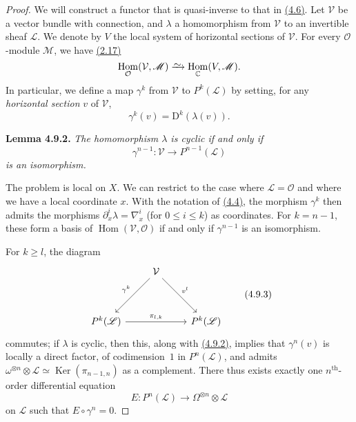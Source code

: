 \documentclass{report}
\newenvironment{itenv}[1]
  {\phantomsection\par\medskip\noindent\textbf{#1.}\itshape}
  {\par\medskip}
\newcommand{\scr}[1]{{\mathscr{#1}}}
\renewcommand{\cal}[1]{{\mathcal{#1}}}
\newcommand{\CC}{\mathbb{C}}
\newcommand{\DD}{\mathrm{D}}
\newcommand{\simto}{\xrightarrow{\raisebox{-0.7ex}[0ex][0ex]{$\sim$}}}
\renewcommand{\geq}{\geqslant}
\renewcommand{\leq}{\leqslant}
\DeclareMathOperator{\Ker}{Ker}
\DeclareMathOperator{\Hom}{Hom}
\newcommand{\oldpage}[1]{\marginpar{\footnotesize$\Big\vert$ \textit{p.~#1}}}
\begin{document}
\begin{proof}
  We will construct a functor that is quasi-inverse to that in \hyperref[I.4.6]{(4.6)}.
  Let $\cal{V}$ be a vector bundle with connection, and $\lambda$ a homomorphism from $\cal{V}$ to an invertible sheaf $\scr{L}$.
  We denote by $V$ the local system of horizontal sections of $\cal{V}$.
  For every $\cal{O}$-module $\scr{M}$, we have \hyperref[I.2.17]{(2.17)}
  \[
    \Hom_\cal{O}(\cal{V},\scr{M}) \simto \Hom_\CC(V,\scr{M}).
  \]
  In particular, we define a map $\gamma^k$ from $\cal{V}$ to $P^k(\scr{L})$ by setting, for any \emph{horizontal section} $v$ of $\cal{V}$,
  \[
  \label{I.4.9.1}
    \gamma^k(v) = \DD^k(\lambda(v)).
  \tag{4.9.1}
  \]

  \begin{itenv}{Lemma 4.9.2}
  \label{I.4.9.2}
    The homomorphism $\lambda$ is cyclic if and only if
    \[
      \gamma^{n-1}\colon \cal{V} \to P^{n-1}(\scr{L})
    \]
    is an isomorphism.
  \end{itenv}

  The problem is local on $X$.
  We can restrict to the case where $\scr{L}=\cal{O}$ and where we have a local coordinate $x$.
  With the notation of \hyperref[I.4.4]{(4.4)}, the morphism $\gamma^k$ then admits the morphisms $\partial_x^i\lambda = \nabla_x^i$ (for $0\leq i\leq k$) as coordinates.
  For $k=n-1$, these form a basis of $\Hom(\cal{V},\cal{O})$ if and only if $\gamma^{n-1}$ is an isomorphism.

  For $k\geq l$, the diagram
\oldpage{28}
  \[
  \label{I.4.9.3}
    \begin{tikzcd}[row sep=huge]
      & \cal{V} \dlar[swap,"\gamma^k"] \drar["v^l"] &
    \\P^k(\scr{L}) \ar[rr,"\pi_{l,k}"] && P^k(\scr{L})
    \end{tikzcd}
  \tag{4.9.3}
  \]
  commutes;
  if $\lambda$ is cyclic, then this, along with \hyperref[I.4.9.2]{(4.9.2)}, implies that $\gamma^n(v)$ is locally a direct factor, of codimension~$1$ in $P^n(\scr{L})$, and admits $\omega^{\otimes n}\otimes\scr{L} \simeq \Ker(\pi_{n-1,n})$ as a complement.
  There thus exists exactly one $n^\mathrm{th}$-order differential equation
  \[
    E\colon P^n(\scr{L}) \to \Omega^{\otimes n}\otimes\scr{L}
  \]
  on $\scr{L}$ such that $E\circ\gamma^n=0$.


\end{proof}
\end{document}
